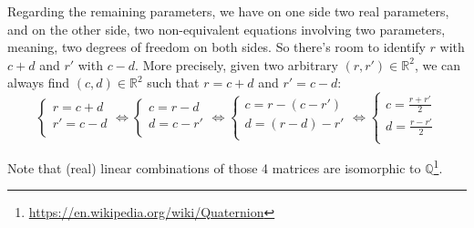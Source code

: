 \documentclass[solutions.tex]{subfiles}
\begin{document}
Regarding the remaining parameters, we have on one side two
real parameters, and on the other side, two non-equivalent equations
involving two parameters, meaning, two degrees of freedom on both sides.
So there's room to identify $r$ with $c+d$ and $r'$ with $c-d$. More
precisely, given two arbitrary $(r, r')\in\mathbb{R}^2$, we can always
find $(c, d)\in\mathbb{R}^2$ such that $r = c+d$ and $r' = c-d$:
\[
	\begin{cases}
		r = c+d \\
		r' = c-d \\
	\end{cases}\Leftrightarrow
	\begin{cases}
		c = r-d \\
		d = c-r' \\
	\end{cases}\Leftrightarrow
	\begin{cases}
		c = r-(c-r') \\
		d = (r-d)-r' \\
	\end{cases}\Leftrightarrow
	\begin{cases}
		c = \frac{r+r'}2 \\
		d = \frac{r-r'}2 \\
	\end{cases}
\]

\begin{remark} Note that (real) linear combinations of those 4 matrices
are isomorphic to  $\mathbb{Q}$\footnote{
\url{https://en.wikipedia.org/wiki/Quaternion}}.
\end{remark}
\end{document}
